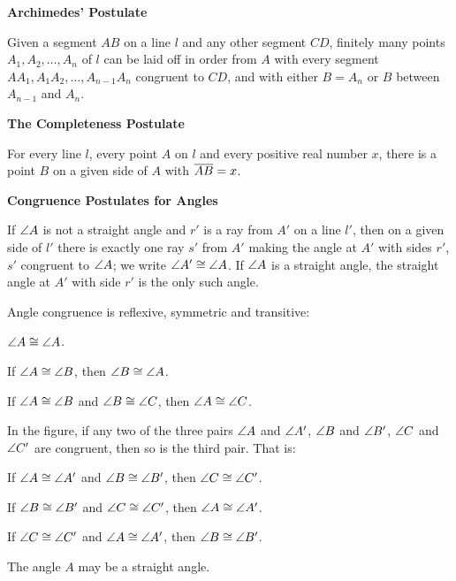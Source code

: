 \documentclass[11pt]{book}
\newcommand{\APPsub}[1]{%
  \par\medskip\begin{center}\bfseries\small #1\end{center}\par\nopagebreak}
\begin{document}
\APPsub{Archimedes' Postulate}

\begin{applist}[resume]
\item Given a segment $AB$ on a line $l$ and any other segment $CD$, finitely
      many points $A_1, A_2, \ldots, A_n$ of $l$ can be laid off in order
      from $A$ with every segment $AA_1, A_1A_2, \ldots, A_{n-1}A_n$
      congruent to $CD$, and with either $B = A_n$ or $B$ between $A_{n-1}$
      and $A_n$.
\end{applist}

\APPsub{The Completeness Postulate}

\begin{applist}[resume]
\item For every line $l$, every point $A$ on $l$ and every positive real
      number $x$, there is a point $B$ on a given side of $A$ with
      $\overline{AB} = x$.
\end{applist}

\APPsub{Congruence Postulates for Angles}

\begin{applist}[resume]
\item If $\angle A$ is not a straight angle and $r'$ is a ray from $A'$ on a
      line $l'$, then on a given side of $l'$ there is exactly one ray $s'$
      from $A'$ making the angle at $A'$ with sides $r'$, $s'$ congruent to
      $\angle A$; we write $\angle A' \cong \angle A$. If $\angle A$ is a
      straight angle, the straight angle at $A'$ with side $r'$ is the only
      such angle.
\item Angle congruence is reflexive, symmetric and transitive:
      \begin{applist}
      \item $\angle A \cong \angle A$.
      \item If $\angle A \cong \angle B$, then $\angle B \cong \angle A$.
      \item If $\angle A \cong \angle B$ and $\angle B \cong \angle C$, then
            $\angle A \cong \angle C$.
      \end{applist}
\item In the figure, if any two of the three pairs $\angle A$ and
      $\angle A'$, $\angle B$ and $\angle B'$, $\angle C$ and $\angle C'$ are
      congruent, then so is the third pair. That is:
      \begin{applist}
      \item If $\angle A \cong \angle A'$ and $\angle B \cong \angle B'$, then
            $\angle C \cong \angle C'$.
      \item If $\angle B \cong \angle B'$ and $\angle C \cong \angle C'$, then
            $\angle A \cong \angle A'$.
      \item If $\angle C \cong \angle C'$ and $\angle A \cong \angle A'$, then
            $\angle B \cong \angle B'$.
      \end{applist}
      The angle $A$ may be a straight angle.
\end{applist}
\end{document}
